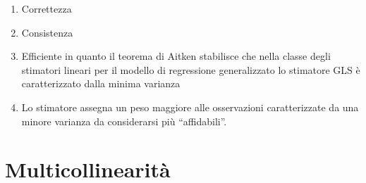 \documentclass[a4page, 11pt]{article}
\begin{document}
\begin{enumerate}[noitemsep]
\item Correttezza
\item Consistenza
\item Efficiente in quanto il teorema di Aitken stabilisce che nella classe degli stimatori lineari per il modello di regressione generalizzato lo stimatore GLS è caratterizzato dalla minima varianza
\item Lo stimatore assegna un peso maggiore alle osservazioni caratterizzate da una minore varianza da considerarsi più ``affidabili''.
\end{enumerate}

\section{Multicollinearità }
\end{document}
